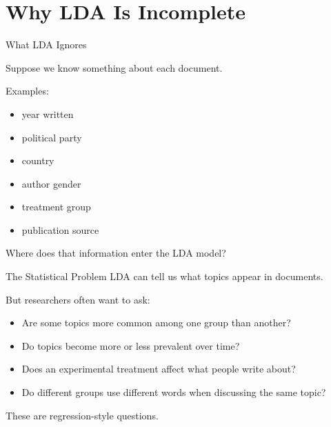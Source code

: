 \documentclass[aspectratio=169]{beamer}
\begin{document}
\section{Why LDA Is Incomplete}

\begin{frame}{What LDA Ignores}

Suppose we know something about each document.

\vspace{0.4cm}

Examples:

\begin{itemize}
  \item year written
  \item political party
  \item country
  \item author gender
  \item treatment group
  \item publication source
\end{itemize}

\vspace{0.4cm}

Where does that information enter the LDA model?

\pause

\pause


\end{frame}
\begin{frame}{The Statistical Problem}
LDA can tell us what topics appear in documents.

\vspace{0.3cm}
But researchers often want to ask:

\begin{itemize}
  \item Are some topics more common among one group than another?
  \item Do topics become more or less prevalent over time?
  \item Does an experimental treatment affect what people write about?
  \item Do different groups use different words when discussing the same topic?
\end{itemize}

\vspace{0.4cm}
These are regression-style questions.
\end{frame}
\end{document}
